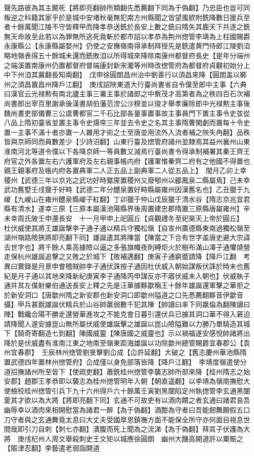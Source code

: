 聲先路彼為其主鬭死【將即亮翻帥所類翻先悉薦翻下同為于偽翻】乃忠臣也豈可同叛逆之科籍其家乎於是城中安堵秋毫無犯南方州縣聞之皆望風欵附銑降數日援兵至者十餘萬聞江陵不守皆釋甲而降孝恭送銑於長安上數之銑曰隋失其鹿天下共逐之銑無天命故至此若以為罪無所逃死竟斬於都市詔以孝恭為荆州揔管李靖為上柱國賜爵永康縣公【永康縣屬婺州】仍使之安撫嶺南得承制拜授先是銑遣黄門侍郎江陵劉洎略地嶺表得五十餘城未還而銑敗洎以所得城來降除南康州都督府長史【是年分端州之端溪置南康州仍置都督府督端康封新宋瀧等州時改揔管府為都督府貞觀初始分上中下州洎其冀翻長知兩翻】　戊申徐圓朗昌州治中劉善行以須昌來降【圓朗盖以鄆州之須昌置昌州降戶江翻】　庚戌詔陜東道大行臺尚書省自令僕至郎中主事【六典曰漢官云光禄勲有南北廬主事三署主事於諸郎之中察茂才高第者為之秩四百石次補尚書郎出宰百里謝承後漢書胡伯藩范滂公沙穆並以俊才舉孝廉除郎中光禄勲主事後魏尚書吏部儀曹三公虞曹都官二千石比部各量事置事故主事員門下置主事令史並從八品上隋初臺省並置主事令史煬帝三年並去令史之名其主事隋曹閑劇而置每十令史置一主事不滿十者亦置一人雜用才術之士至唐並用流外入流者補之陜失冉翻】品秩皆與京師同而員數差少【少詩沼翻】山東行臺及揔管府諸州並隸焉其益州襄州山東淮南河北等道令僕以下各降京師一等員數又減焉行臺尚書令得承制補署其秦王齊王府官之外各置左右六護軍府及左右親事帳内府【護軍惟秦齊二府有之他國不得置也親王親事府及帳内府各置典軍二人正五品上副典軍二人從五品上】　閠月乙卯上幸稷州【武德三年以京兆之武功好時盩厔置稷州又廢郇州以郿鳳泉二縣屬焉】己未幸武功舊墅壬戌獵于好畤【武德二年分醴泉置好畤縣屬雍州因漢舊名也】乙丑獵于九嵕【九嵕山在雍州醴泉縣嵕子紅翻】丁卯獵于仲山戊辰獵于清水谷【隋志京兆宜君縣有清水】遂幸三原【三原本屬漢池陽縣界後周置建忠郡隋置三原縣唐屬雍州】辛未幸周氏陂壬申還長安　十一月甲申上祀圓丘【貞觀禮冬至祀昊天上帝於圓丘】　杜伏威使其將王雄誕擊李子通子通以精兵守獨松嶺【自宣州廣德縣東南過獨松嶺至湖州嶺路險狹將即亮翻下同】雄誕遣其將陳當【陳當之下合有世字盖唐史避大宗諱去世字也】將千餘人乘高據險以逼之多張旗幟夜則縛炬火於樹布滿山澤子通懼燒營走保杭州雄誕追擊之又敗之於城下【敗補邁翻】庚寅子通窮蹙請降【降戶江翻　考異曰實録是月景申會稽賊帥李子通伏誅按子通因杜伏威入朝始謀叛伏誅於時未也舊紀是月子通以其地來降新紀庚寅李子通降丙申謀反亦不寤伏威未入朝也】伏威執子通并其左僕射樂伯通送長安上釋之先是汪華據黟歙稱王十餘年雄誕還軍擊之華拒之於新安洞口【唐歙州隋之新安郡也新安洞口即歙州隘道之口先悉薦翻黟音伊歙音攝】甲兵甚銳雄誕伏精兵於山谷帥羸弱數千犯其陳【帥讀曰率下同羸倫為翻陳讀曰陣】戰纔合陽不勝走還營華進攻之不能克會日暮引還伏兵已據其洞口華不得入窘迫請降聞人遂安據崑山無所屬伏威使雄誕擊之雄誕以崑山險隘難以力勝乃單騎造其城下【騎奇寄翻造七到翻】陳國威靈【陳唐國之威靈也】示以禍福遂安感悅帥諸將出降於是伏威盡有淮南江東之地南至嶺東距海雄誕以功除歙州總管賜爵宜春郡公【袁州宜春郡】　壬辰林州揔管劉旻擊劉仚成【仚許延翻】大破之【舊志慶州華池縣隋置武德四年置林州揔管府】仚成僅以身免部落皆降【降戶江翻】　李靖度嶺遣使分道招撫諸州所至皆下【使疏吏翻】蕭銑桂州揔管李襲志帥所部來降【桂州隋志之始安郡】趙郡王孝恭即以襲志為桂州揔管明年入朝【朝直遥翻】以李靖為嶺南撫慰大使檢校桂州揔管引兵下九十六州得戶六十餘萬壬寅劉黑闥䧟定州執揔管李玄通黑闥愛其才欲以為大將【將即亮翻下同】玄通不可故吏有以酒肉饋之者玄通曰諸君哀吾幽辱幸以酒肉來相開慰當為諸君一醉【為于偽翻】酒酣為守者曰吾能劒舞願假五口刀守者與之玄通舞竟太息曰大丈夫受國厚恩鎮撫方面不能保全所守亦何面目視息世間哉即引刀自刺【刺七亦翻】潰腹而死上聞為之流涕【為于偽翻】拜其子伏護為大將　庚戌杞州人周文舉殺刺史王文矩以城應徐圓朗　幽州大饑高開道許以粟賑之【賑津忍翻】李藝遣老弱詣開道